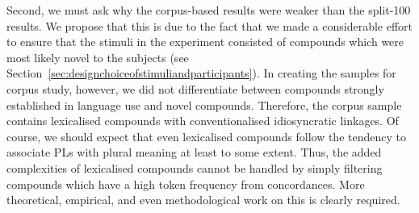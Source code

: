 Second, we must ask why the corpus-based results were weaker than the split-100 results.
We propose that this is due to the fact that we made a considerable effort to ensure that the stimuli in the experiment consisted of compounds which were most likely novel to the subjects (see Section~\ref{sec:designchoiceofstimuliandparticipants}).
In creating the samples for corpus study, however, we did not differentiate between compounds strongly established in language use and novel compounds.
Therefore, the corpus sample contains lexicalised compounds with conventionalised idiosyncratic linkages.
Of course, we should expect that even lexicalised compounds follow the tendency to associate PLs with plural meaning at least to some extent.
Thus, the added complexities of lexicalised compounds cannot be handled by simply filtering compounds which have a high token frequency from concordances.
More theoretical, empirical, and even methodological work on this is clearly required.

